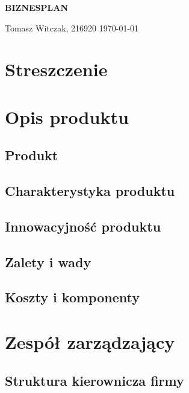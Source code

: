 \documentclass[12pt]{article}
\begin{document}
\begin{titlepage}
    \hspace{0em}
    \vfill
    \begin{vwcol}[widths={0.2,0.8}, sep=2em, rule=0em]
        {\normalsize \textbf{\uppercase{Biznesplan}}}

        \vfill\eject

        {\LARGE {}} \newline \vspace{1em}
        {\large Tomasz Witczak, 216920} \newline \vspace{1em}
        {\normalsize \today}
    \end{vwcol}
    \vfill
    \hspace{0em}
\end{titlepage}

\section{Streszczenie}

\section{Opis produktu}
\subsection{Produkt}
\subsection{Charakterystyka produktu}
\subsection{Innowacyjność produktu}
\subsection{Zalety i wady}
\subsection{Koszty i komponenty}

\section{Zespół zarządzający}
\subsection{Struktura kierownicza firmy}
\end{document}
